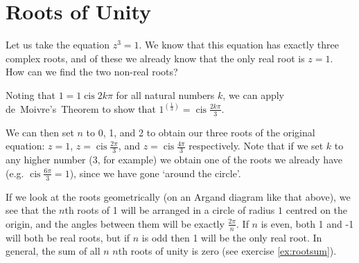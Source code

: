 \documentclass[a4paper,10pt,titlepage]{article}
\theoremstyle{definition}
\DeclareMathOperator{\cis}{cis}
\begin{document}
\section{Roots of Unity}
Let us take the equation $ z^3 = 1 $. We know that this equation has exactly three complex
roots, and of these we already know that the only real root is $ z = 1 $. How can we find
the two non-real roots?

Noting that $ 1 = 1 \cis 2k\pi $ for all natural numbers $ k $, we can apply de~Moivre's~Theorem
to show that $ 1^{(\frac{1}{3})} = \cis \frac{2k\pi}{3} $.

We can then set $ n $ to 0, 1, and 2 to obtain our three roots of the original
equation: $ z = 1 $, $ z = \cis \frac{2\pi}{3} $, and $ z = \cis \frac{4\pi}{3} $
respectively. Note that if we set $ k $ to any higher number (3, for example) we
obtain one of the roots we already have (e.g. $ \cis \frac{6\pi}{3} = 1 $), since we
have gone `around the circle'.

\begin{center}\end{center}

If we look at the roots geometrically (on an Argand diagram like that above), we see that
the $ n$th roots of 1 will be arranged in a circle of radius $ 1 $ centred on the origin, and the
angles between them will be exactly $ \frac{2\pi}{n} $. If $ n $ is even, both 1 and -1 will both
be real roots, but if $ n $ is odd then 1 will be the only real root. In general, the sum of all
$ n $ $n$th roots of unity is zero (see exercise \ref{ex:rootsum}).
\end{document}
